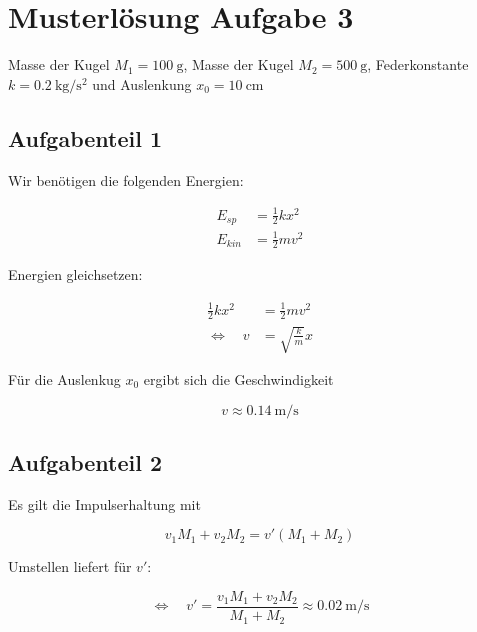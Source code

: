\section{Musterlösung Aufgabe 3}
Masse der Kugel $M_1=\SI{100}{\gram}$,
Masse der Kugel $M_2=\SI{500}{\gram}$,
Federkonstante $k=\SI{0.2}{\kilo\gram\per\square\second}$ und Auslenkung $x_0=\SI{10}{\centi\meter}$

\subsection{Aufgabenteil 1}
Wir benötigen die folgenden Energien:

\begin{align*}
E_{sp}&=\frac{1}{2}kx^2\\
E_{kin}&=\frac{1}{2}mv^2
\end{align*}

Energien gleichsetzen:

\begin{align*}
\frac{1}{2}kx^2&=\frac{1}{2}mv^2\\
\Leftrightarrow \quad v&=\sqrt{\frac{k}{m}}x
\end{align*}

Für die Auslenkug $x_0$ ergibt sich die Geschwindigkeit

\begin{equation*}
v \approx \SI{0.14}{\meter\per\second}
\end{equation*}

\subsection{Aufgabenteil 2}

Es gilt die Impulserhaltung mit

\begin{equation*}
v_1M_1+v_2M_2=v'\left(M_1+M_2\right)
\end{equation*}

Umstellen liefert für $v'$:

\begin{equation*}
\Leftrightarrow \quad v'=\frac{v_1M_1+v_2M_2}{M_1+M_2} \approx \SI{0.02}{\meter\per\second}
\end{equation*}

